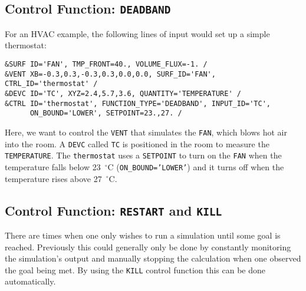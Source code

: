 \documentclass[11pt]{book}
\newcommand{\ct}{\tt\small}
\begin{document}




\subsection{Control Function: \texorpdfstring{{\tt DEADBAND}}{DEADBAND}}

For an HVAC example, the following lines of input would set up a simple thermostat:

\footnotesize
\begin{verbatim}
&SURF ID='FAN', TMP_FRONT=40., VOLUME_FLUX=-1. /
&VENT XB=-0.3,0.3,-0.3,0.3,0.0,0.0, SURF_ID='FAN', CTRL_ID='thermostat' /
&DEVC ID='TC', XYZ=2.4,5.7,3.6, QUANTITY='TEMPERATURE' /
&CTRL ID='thermostat', FUNCTION_TYPE='DEADBAND', INPUT_ID='TC',
      ON_BOUND='LOWER', SETPOINT=23.,27. /
\end{verbatim} \normalsize

\noindent
Here, we want to control the {\ct VENT} that simulates the {\ct FAN}, which blows hot air
into the room. A {\ct DEVC} called {\ct TC} is positioned in the room to measure the {\ct TEMPERATURE}.
The {\ct thermostat} uses a {\ct SETPOINT} to turn on the
{\ct FAN} when the temperature falls below 23~$^\circ$C ({\ct ON\_BOUND='LOWER'}) 
and it turns off when the temperature rises above 27~$^\circ$C.



\subsection{Control Function: \texorpdfstring{{\tt RESTART} and {\tt KILL}} {RESTARTKILL} }

There are times when one only wishes to run a simulation until some
goal is reached.  Previously this could generally only be done by
constantly monitoring the simulation's output and manually stopping
the calculation when one observed  the goal being met.  By using the
{\ct KILL} control function this can be done automatically.
\end{document}
